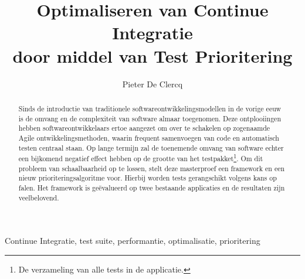 \documentclass[10pt,twocolumn,twoside]{phdsymp-nl}
\begin{document}
	\title{Optimaliseren van Continue Integratie\\ door middel van Test Prioritering}
	\author{Pieter De Clercq}
	\maketitle
	
	\begin{abstract}
	Sinds de introductie van traditionele softwareontwikkelingsmodellen in de vorige eeuw is de omvang en de complexiteit van software almaar toegenomen. Deze ontplooiingen hebben softwareontwikkelaars ertoe aangezet om over te schakelen op zogenaamde Agile ontwikkelingsmethoden, waarin frequent samenvoegen van code en automatisch testen centraal staan. Op lange termijn zal de toenemende omvang van software echter een bijkomend negatief effect hebben op de grootte van het testpakket\footnote{De verzameling van alle tests in de applicatie.}. Om dit probleem van schaalbaarheid op te lossen, stelt deze masterproef een framework en een nieuw prioriteringsalgoritme voor. Hierbij worden tests gerangschikt volgens kans op falen. Het framework is ge\"evalueerd op twee bestaande applicaties en de resultaten zijn veelbelovend.
	\end{abstract}

	\begin{keywords}
		Continue Integratie, test suite, performantie, optimalisatie, prioritering
	\end{keywords}

	
	
	
	
	
	
	
	
	
\end{document}
